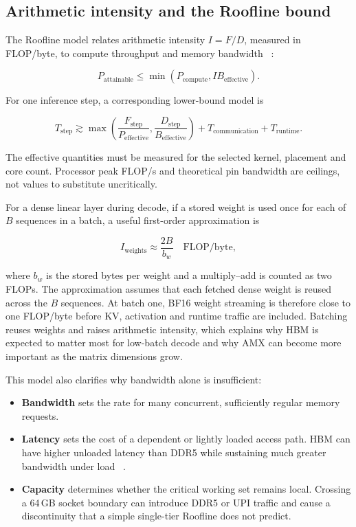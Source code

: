\subsection{Arithmetic intensity and the Roofline bound}
\label{sec:roofline}

The Roofline model relates arithmetic intensity \(I=F/D\), measured in
FLOP/byte, to compute throughput and memory bandwidth
~\cite{williams2009roofline}:

\[
  P_{\mathrm{attainable}}
  \leq
  \min\!\left(P_{\mathrm{compute}},
              I B_{\mathrm{effective}}\right).
\]

For one inference step, a corresponding lower-bound model is

\[
  T_{\mathrm{step}}
  \gtrsim
  \max\!\left(
      \frac{F_{\mathrm{step}}}{P_{\mathrm{effective}}},
      \frac{D_{\mathrm{step}}}{B_{\mathrm{effective}}}
  \right)
  + T_{\mathrm{communication}} + T_{\mathrm{runtime}}.
\]

The effective quantities must be measured for the selected kernel,
placement and core count.  Processor peak FLOP/s and theoretical pin
bandwidth are ceilings, not values to substitute uncritically.

For a dense linear layer during decode, if a stored weight is used once
for each of \(B\) sequences in a batch, a useful first-order
approximation is

\[
  I_{\mathrm{weights}} \approx \frac{2B}{b_w}
  \quad \text{FLOP/byte},
\]

where \(b_w\) is the stored bytes per weight and a multiply--add is
counted as two FLOPs.  The approximation assumes that each fetched dense
weight is reused across the \(B\) sequences.  At batch one, BF16 weight
streaming is therefore close to one FLOP/byte before KV,
activation and runtime traffic are included.  Batching reuses weights
and raises arithmetic intensity, which explains why HBM is expected to
matter most for low-batch decode and why AMX can become more important
as the matrix dimensions grow.

This model also clarifies why bandwidth alone is insufficient:

\begin{itemize}
  \item \textbf{Bandwidth} sets the rate for many concurrent,
        sufficiently regular memory requests.
  \item \textbf{Latency} sets the cost of a dependent or lightly loaded
        access path.  HBM can have higher unloaded latency than DDR5
        while sustaining much greater bandwidth under load
        ~\cite{ibeid2025aurora}.
  \item \textbf{Capacity} determines whether the critical working set
        remains local.  Crossing a 64\,GB socket boundary can introduce
        DDR5 or UPI traffic and cause a discontinuity that a simple
        single-tier Roofline does not predict.
\end{itemize}

